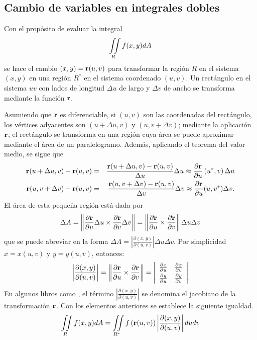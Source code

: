\subsection{Cambio de variables en integrales dobles} \label{cambioidobles}

Con el propósito de evaluar la integral $$\displaystyle \iint\limits_{R}f(x,y) dA$$
se hace el cambio $(x,y) ={\bf r}(u,v)$ para transformar la región $R$ en el sistema
$(x,y) $ en una región $R^{\ast }$ en el sistema coordenado  $(u,v)$.
Un rectángulo en el sistema $uv$ con lados de longitud $\Delta u$ de largo y $\Delta v$ de ancho se transforma mediante la función ${\bf r}$.

Asumiendo que ${\bf r}$ es diferenciable, si $(u,v) $ son las coordenadas del rectángulo, los vértices
adyacentes son $( u+\Delta u,v) $ y $(u,v+\Delta v)$; mediante la aplicación ${\bf r}$, el rectángulo
se transforma en una región cuya área se puede aproximar mediante el área de un paralelogramo. Además,
aplicando el teorema del valor medio, se sigue que
\begin{eqnarray*}
{\bf r}(u+\Delta u,v) -{\bf r}(u,v) &=& \frac{{\bf r}( u+\Delta u,v)-{\bf r}(u,v)}{\Delta u}\Delta u
\approx \frac{\partial {\bf r}}{\partial u}\left( u^{\ast},v\right)\Delta u \\
{\bf r}(u,v+\Delta v) -{\bf r}(u,v) &=& \frac{{\bf r}(u,v+\Delta v)-{\bf r}(u,v)}{\Delta v}\Delta v
\approx \frac{\partial{\bf r}}{\partial u}( u,v^{\ast})\Delta v.
\end{eqnarray*}
El área de esta pequeña región está dada por
\begin{equation}
\Delta A=\left\Vert \frac{\partial {\bf r}}{\partial u}\Delta u\times
\frac{\partial {\bf r}}{\partial v}\Delta v\right\Vert =\left\Vert \frac{\partial {\bf r}}{\partial u}\times \frac{\partial {\bf r}}{\partial v}\right\Vert \Delta u\Delta v
\end{equation}
que se puede abreviar en la forma
$\Delta A=\left\vert \frac{\partial (x,y)}{\partial (u,v)}\right \vert \Delta u\Delta v$.
Por simplicidad $x=x(u,v)$ y $y=y(u,v)$, entonces:
\begin{equation}
\left\vert \frac{\partial (x,y) }{\partial(u,v)}\right\vert =\left\Vert\frac{\partial{\bf r}}{\partial u}\times \frac{\partial{\bf r}}{\partial v}\right\Vert =
\left\vert
\begin{array}{cc}\frac{\partial x}{\partial u}&\frac{\partial x}{\partial v}\\[.1cm]
\frac{\partial y}{\partial u} & \frac{\partial y}{\partial v}
\end{array} \right\vert
\end{equation}
En algunos libros como \cite{stewart_calculo_2018}, el término $\left\vert \frac{\partial\left(x,y\right)}{\partial(u,v)}\right\vert$
se denomina el jacobiano de la transformación ${\bf r}$. 
Con los elementos anteriores se establece la siguiente igualdad.
\begin{equation}
\iint\limits_{R}f(x,y) dA=\iint\limits_{R^{\ast }}f\left({\bf r}(u,v) \right) \left\vert \frac{\partial (x,y) }{\partial (u,v)}\right\vert dudv
\end{equation}

